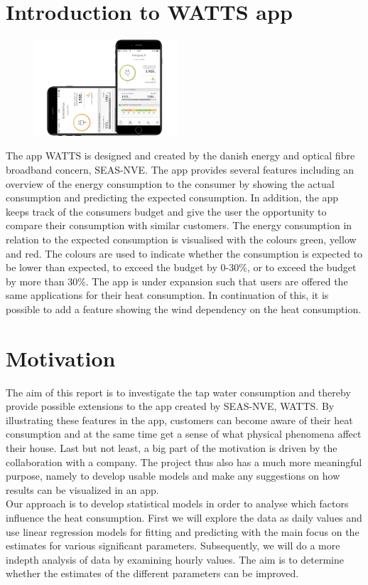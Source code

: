 \section{Introduction to WATTS app}
\begin{figure}
    \vspace{-20pt}
      \includegraphics[width=0.48\textwidth]{../../../figures/Watts.png}
    \vspace{-10pt}
  \end{figure}
The app WATTS is designed and created by the danish energy and optical fibre broadband concern, SEAS-NVE. The app provides several features including an overview of the energy consumption to the consumer by showing the actual consumption and predicting the expected consumption. 
In addition, the app keeps track of the consumers budget and give the user the opportunity to compare their consumption with similar customers. The energy consumption in relation to the expected consumption is visualised with the colours green, yellow and red. The colours are used to indicate whether the consumption is expected to be lower than expected, to exceed the budget by 0-30\%, or to exceed the budget by more than 30\%.
\noindent The app is under expansion such that users are offered the same applications for their heat consumption. In continuation of this, it is possible to add a feature showing the wind dependency on the heat consumption.

\section{Motivation}
The aim of this report is to investigate the tap water consumption and thereby provide possible extensions to the app created by SEAS-NVE, WATTS. By illustrating these features in the app, customers can become aware of their heat consumption and at the same time get a sense of what physical phenomena affect their house. 
\noindent Last but not least, a big part of the motivation is driven by the collaboration with a company. The project thus also has a much more meaningful purpose, namely to develop usable models and make any suggestions on how results can be visualized in an app. \\

\noindent Our approach is to develop statistical models in order to analyse which factors influence the heat consumption. First we will explore the data as daily values and use linear regression models for fitting and predicting with the main focus on the estimates for various significant parameters. Subsequently, we will do a more indepth analysis of data by examining hourly values. The aim is to determine whether the estimates of the different parameters can be improved. 
